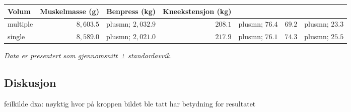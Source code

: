 \documentclass[
  letterpaper,
  DIV=11,
  numbers=noendperiod]{scrartcl}
\begin{document}
\begin{table}
\begin{minipage}[t]{\linewidth}
{\centering 

\setlength{\LTpost}{0mm}
\begin{longtable*}{lrrr}
\toprule
Volum & Muskelmasse (g) & Benpress (kg) & Kneekstensjon (kg) \\ 
\midrule\addlinespace[2.5pt]
multiple & $8,603.5$ &plusmn; $2,032.9$ & $208.1$ &plusmn; $76.4$ & $69.2$ &plusmn; $23.3$ \\ 
single & $8,589.0$ &plusmn; $2,021.0$ & $217.9$ &plusmn; $76.1$ & $74.3$ &plusmn; $25.5$ \\ 
\bottomrule
\end{longtable*}
\begin{minipage}{\linewidth}
\emph{Data er presentert som gjennomsnitt ± standardavvik.}\\
\end{minipage}

}

\end{minipage}%

\end{table}

\hypertarget{diskusjon}{%
\subsection{Diskusjon}\label{diskusjon}}

feilkilde dxa: nøyktig hvor på kroppen bildet ble tatt har betydning for
resultatet
\end{document}

